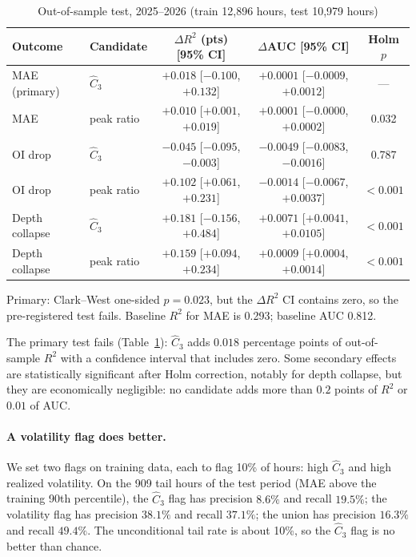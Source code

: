 \begin{table}[t]\centering
\begin{threeparttable}
\caption{Out-of-sample test, 2025--2026 (train 12,896 hours, test 10,979 hours)}\label{tab:d8}
\small\setlength{\tabcolsep}{4pt}
\begin{tabular}{llccc}
\toprule
Outcome & Candidate & $\Delta R^2$ (pts) [95\% CI] & $\Delta$AUC [95\% CI] & Holm $p$\\
\midrule
MAE (primary) & $\hat C_3$ & $+0.018$ [$-0.100$, $+0.132$] & $+0.0001$ [$-0.0009$, $+0.0012$] & ---\\
MAE & peak ratio & $+0.010$ [$+0.001$, $+0.019$] & $+0.0001$ [$-0.0000$, $+0.0002$] & 0.032\\
OI drop & $\hat C_3$ & $-0.045$ [$-0.095$, $-0.003$] & $-0.0049$ [$-0.0083$, $-0.0016$] & 0.787\\
OI drop & peak ratio & $+0.102$ [$+0.061$, $+0.231$] & $-0.0014$ [$-0.0067$, $+0.0037$] & $<0.001$\\
Depth collapse & $\hat C_3$ & $+0.181$ [$-0.156$, $+0.484$] & $+0.0071$ [$+0.0041$, $+0.0105$] & $<0.001$\\
Depth collapse & peak ratio & $+0.159$ [$+0.094$, $+0.234$] & $+0.0009$ [$+0.0004$, $+0.0014$] & $<0.001$\\
\bottomrule
\end{tabular}
\begin{tablenotes}\footnotesize\item Primary: Clark--West one-sided $p=0.023$, but the $\Delta R^2$ CI contains zero, so the pre-registered test fails. Baseline $R^2$ for MAE is 0.293; baseline AUC 0.812. \end{tablenotes}
\end{threeparttable}
\end{table}

The primary test fails (Table~\ref{tab:d8}): $\hat C_3$ adds $0.018$ percentage points of out-of-sample $R^2$ with a confidence interval that includes zero. Some secondary effects are statistically significant after Holm correction, notably for depth collapse, but they are economically negligible: no candidate adds more than $0.2$ points of $R^2$ or $0.01$ of AUC.

\paragraph{A volatility flag does better.} We set two flags on training data, each to flag 10\% of hours: high $\hat C_3$ and high realized volatility. On the 909 tail hours of the test period (MAE above the training 90th percentile), the $\hat C_3$ flag has precision $8.6\%$ and recall $19.5\%$; the volatility flag has precision $38.1\%$ and recall $37.1\%$; the union has precision $16.3\%$ and recall $49.4\%$. The unconditional tail rate is about 10\%, so the $\hat C_3$ flag is no better than chance.

